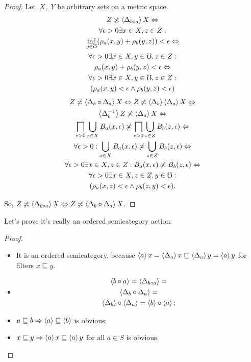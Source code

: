 \begin{proof}
Let~$X$,~$Y$ be arbitrary sets on a metric space.
\begin{multline*}
Z\not\asymp\left\langle \Delta_{b\circ a}\right\rangle X \Leftrightarrow \\
\forall\epsilon>0\exists x\in X,z\in Z:\\\inf_{y\in\mho}(\rho_a(x,y)+\rho_b(y,z))<\epsilon \Leftrightarrow \\
\forall\epsilon>0\exists x\in X,y\in\mho,z\in Z:\\\rho_a(x,y)+\rho_b(y,z)<\epsilon \Leftrightarrow \\
\forall\epsilon>0\exists x\in X,y\in\mho,z\in Z:\\(\rho_a(x,y)<\epsilon\land\rho_b(y,z)<\epsilon)
\end{multline*}
\begin{multline*}
Z\not\asymp\left\langle \Delta_b\circ\Delta_a\right\rangle X \Leftrightarrow
Z\not\asymp\left\langle \Delta_b\right\rangle\left\langle \Delta_a\right\rangle X\Leftrightarrow\\
\left\langle \Delta_b^{-1}\right\rangle Z\not\asymp\left\langle \Delta_a\right\rangle X \Leftrightarrow\\
\bigsqcap_{\epsilon>0}\bigcup_{x\in X}B_a(x,\epsilon) \not\asymp\bigsqcap_{\epsilon>0}\bigcup_{z\in Z}B_b(z,\epsilon) \Leftrightarrow \\
\forall\epsilon>0:\bigcup_{x\in X}B_a(x,\epsilon) \not\asymp\bigcup_{z\in Z}B_b(z,\epsilon) \Leftrightarrow \\
\forall\epsilon>0\exists x\in X,z\in Z:B_a(x,\epsilon)\not\asymp B_b(z,\epsilon) \Leftrightarrow \\
\forall\epsilon>0\exists x\in X,z\in Z,y\in\mho:\\(\rho_a(x,z)<\epsilon\land\rho_b(z,y)<\epsilon).
\end{multline*}

So, $Z\not\asymp\left\langle \Delta_{b\circ a}\right\rangle X \Leftrightarrow Z\not\asymp\left\langle \Delta_b\circ\Delta_a\right\rangle X$.
\end{proof}

Let's prove it's really an ordered semicategory action:

\begin{proof}
~
\begin{itemize}
\item It is an ordered semicategory, because
$\left\langle a\right\rangle x = \left\langle \Delta_a\right\rangle x \sqsubseteq \left\langle \Delta_a\right\rangle y = \left\langle a\right\rangle y$ 
for filters $x\sqsubseteq y$.

\item
\begin{multline*}
\left\langle b\circ a\right\rangle = \left\langle \Delta_{b\circ a}\right\rangle = \\ \left\langle \Delta_b\circ\Delta_a\right\rangle = \\ \left\langle \Delta_b\right\rangle\circ\left\langle \Delta_a\right\rangle = \left\langle b\right\rangle\circ\left\langle a\right\rangle;
\end{multline*}
\item $a\sqsubseteq b\Rightarrow \left\langle a\right\rangle\sqsubseteq \left\langle b\right\rangle$ is obvious;
\item $x\sqsubseteq y\Rightarrow\left\langle a\right\rangle x\sqsubseteq \left\langle a\right\rangle y$ for all $a\in S$ is obvious.
\end{itemize}
\end{proof}

